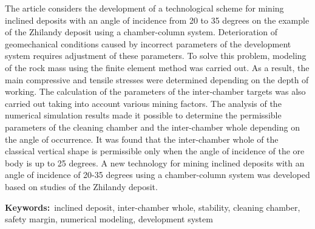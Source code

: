 The article considers the development of a technological scheme for
mining inclined deposits with an angle of incidence from 20 to 35
degrees on the example of the Zhilandy deposit using a chamber-column
system. Deterioration of geomechanical conditions caused by incorrect
parameters of the development system requires adjustment of these
parameters. To solve this problem, modeling of the rock mass using the
finite element method was carried out. As a result, the main compressive
and tensile stresses were determined depending on the depth of working.
The calculation of the parameters of the inter-chamber targets was also
carried out taking into account various mining factors. The analysis of
the numerical simulation results made it possible to determine the
permissible parameters of the cleaning chamber and the inter-chamber
whole depending on the angle of occurrence. It was found that the
inter-chamber whole of the classical vertical shape is permissible only
when the angle of incidence of the ore body is up to 25 degrees. A new
technology for mining inclined deposits with an angle of incidence of
20-35 degrees using a chamber-column system was developed based on
studies of the Zhilandy deposit.

{\bfseries Keywords:}~inclined deposit, inter-chamber whole, stability, cleaning
chamber, safety margin, numerical modeling, development system

